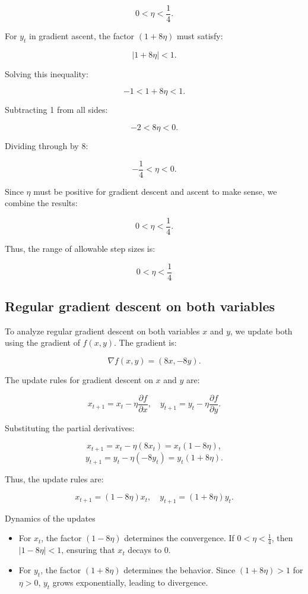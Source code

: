 \documentclass[11pt]{article}
\begin{document}
\[
0 < \eta < \frac{1}{4}.
\]

For \(y_t\) in gradient ascent, the factor \((1 + 8\eta)\) must satisfy:

\[
|1 + 8\eta| < 1.
\]

Solving this inequality:

\[
-1 < 1 + 8\eta < 1.
\]

Subtracting 1 from all sides:

\[
-2 < 8\eta < 0.
\]

Dividing through by \(8\):

\[
-\frac{1}{4} < \eta < 0.
\]

Since \(\eta\) must be positive for gradient descent and ascent to make sense, we combine the results:

\[
0 < \eta < \frac{1}{4}.
\]

Thus, the range of allowable step sizes is:

\[
\boxed{0 < \eta < \frac{1}{4}}
\]

\subsection{Regular gradient descent on both variables}

To analyze regular gradient descent on both variables \(x\) and \(y\), we update both using the gradient of \(f(x, y)\). The gradient is:

\[
\nabla f(x, y) = (8x, -8y).
\]

The update rules for gradient descent on \(x\) and \(y\) are:

\[
x_{t+1} = x_t - \eta \frac{\partial f}{\partial x}, \quad y_{t+1} = y_t - \eta \frac{\partial f}{\partial y}.
\]

Substituting the partial derivatives:

\[
x_{t+1} = x_t - \eta (8x_t) = x_t (1 - 8\eta),
\]
\[
y_{t+1} = y_t - \eta (-8y_t) = y_t (1 + 8\eta).
\]

Thus, the update rules are:

\[
x_{t+1} = (1 - 8\eta)x_t, \quad y_{t+1} = (1 + 8\eta)y_t.
\]

Dynamics of the updates

\begin{itemize}
    \item For \(x_t\), the factor \((1 - 8\eta)\) determines the convergence. If \(0 < \eta < \frac{1}{4}\), then \(|1 - 8\eta| < 1\), ensuring that \(x_t\) decays to 0.
    \item For \(y_t\), the factor \((1 + 8\eta)\) determines the behavior. Since \((1 + 8\eta) > 1\) for \(\eta > 0\), \(y_t\) grows exponentially, leading to divergence.
\end{itemize}
\end{document}
